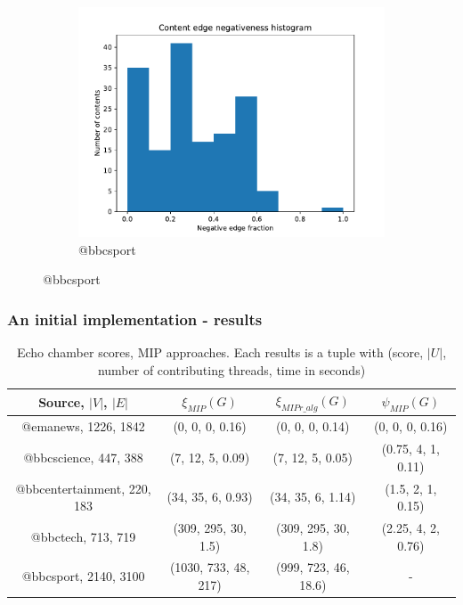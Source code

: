 \documentclass{beamer}
\begin{document}
\begin{frame}[c]
\begin{figure}
\begin{center}
\begin{subfigure}[b]{0.3\textwidth}
			\end{subfigure}
			\begin{subfigure}[b]{0.3\textwidth}
				\centering
				\includegraphics[width=\textwidth]{out/bbcsport200/neg-fraction-content-hist.pdf}
				\caption{@bbcsport}
				\label{fig:out/bbcsport200/neg-fraction-content-hist.pdf}
			\end{subfigure}
		\end{center}
	\end{figure}

\end{frame}


\begin{frame}[c]
	\frametitle{An initial implementation - results}

	\tiny{
		\begin{table}[htpb]
			\centering
			\caption{Echo chamber scores, MIP approaches. Each results is a tuple
				with (score, $|U|$, number of contributing threads, time in
				seconds)}
			\begin{tabular}{c|c|c|c}
				\textbf{Source, $|V|$, $|E|$} & $\xi_{MIP}(G) $      &
				$\xi_{MIPr\_alg}(G)$          & $\psi_{MIP} (G)$                                                \\
				\hline
				{@emanews, 1226, 1842}        & (0, 0, 0, 0.16)      & (0, 0, 0, 0.14)     & (0, 0, 0, 0.16)    \\
				{@bbcscience, 447, 388}       & (7, 12, 5, 0.09)     & (7, 12, 5, 0.05)    & (0.75, 4, 1, 0.11) \\
				{@bbcentertainment, 220, 183} & (34, 35, 6, 0.93)    & (34, 35, 6, 1.14)   & (1.5, 2, 1, 0.15)  \\
				{@bbctech, 713, 719}          & (309, 295, 30, 1.5)  & (309, 295, 30, 1.8) & (2.25, 4, 2, 0.76) \\
				{@bbcsport, 2140, 3100}       & (1030, 733, 48, 217) & (999,
				723, 46, 18.6)                & -                                                               \\
			\end{tabular}
		\end{table}
	}
\end{frame}
\end{document}
